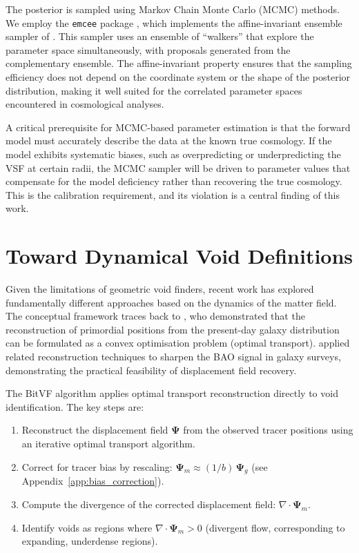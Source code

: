 \documentclass[12pt]{report}
\begin{document}
The posterior is sampled using Markov Chain Monte Carlo (MCMC) methods. We employ the \texttt{emcee} package \citep{ForemanMackey2013}, which implements the affine-invariant ensemble sampler of \citet{GoodmanWeare2010}. This sampler uses an ensemble of ``walkers'' that explore the parameter space simultaneously, with proposals generated from the complementary ensemble. The affine-invariant property ensures that the sampling efficiency does not depend on the coordinate system or the shape of the posterior distribution, making it well suited for the correlated parameter spaces encountered in cosmological analyses.

A critical prerequisite for MCMC-based parameter estimation is that the forward model must accurately describe the data at the known true cosmology. If the model exhibits systematic biases, such as overpredicting or underpredicting the VSF at certain radii, the MCMC sampler will be driven to parameter values that compensate for the model deficiency rather than recovering the true cosmology. This is the calibration requirement, and its violation is a central finding of this work.


\section{Toward Dynamical Void Definitions}

Given the limitations of geometric void finders, recent work has explored fundamentally different approaches based on the dynamics of the matter field. The conceptual framework traces back to \citet{Brenier2003}, who demonstrated that the reconstruction of primordial positions from the present-day galaxy distribution can be formulated as a convex optimisation problem (optimal transport). \citet{Eisenstein2007} applied related reconstruction techniques to sharpen the BAO signal in galaxy surveys, demonstrating the practical feasibility of displacement field recovery.

The BitVF algorithm \citep{Sartori2025} applies optimal transport reconstruction directly to void identification. The key steps are:
\begin{enumerate}
    \item Reconstruct the displacement field $\boldsymbol{\Psi}$ from the observed tracer positions using an iterative optimal transport algorithm.
    \item Correct for tracer bias by rescaling: $\boldsymbol{\Psi}_m \approx (1/b)\,\boldsymbol{\Psi}_g$ (see Appendix~\ref{app:bias_correction}).
    \item Compute the divergence of the corrected displacement field: $\nabla \cdot \boldsymbol{\Psi}_m$.
    \item Identify voids as regions where $\nabla \cdot \boldsymbol{\Psi}_m > 0$ (divergent flow, corresponding to expanding, underdense regions).
\end{enumerate}
\end{document}
